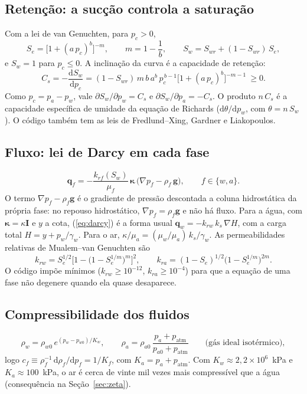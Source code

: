 \documentclass[11pt,a4paper]{article}
\newcommand{\vq}{\bm q}
\newcommand{\vg}{\bm g}
\newcommand{\tkap}{\bm\kappa}
\newcommand{\tI}{\bm I}
\newcommand{\patm}{p_{\mathrm{atm}}}
\newcommand{\dd}{\mathrm d}
\begin{document}
\subsection{Retenção: a sucção controla a saturação}
Com a lei de van Genuchten, para $p_c>0$,
\begin{equation}
S_e=\big[1+(a\,p_c)^{b}\big]^{-m},\qquad m=1-\frac1b,\qquad
S_w=S_{wr}+(1-S_{wr})\,S_e ,
\label{eq:vg}
\end{equation}
e $S_w=1$ para $p_c\le 0$. A inclinação da curva é a capacidade de retenção:
\begin{equation}
C_s=-\frac{\dd S_w}{\dd p_c}
=(1-S_{wr})\,m\,b\,a^{b}\,p_c^{\,b-1}\big[1+(a\,p_c)^{b}\big]^{-m-1}\ \ge 0 .
\label{eq:Cs}
\end{equation}
Como $p_c=p_a-p_w$, vale $\partial S_w/\partial p_w=C_s$ e $\partial S_w/\partial p_a=-C_s$.
O produto $n\,C_s$ é a capacidade específica de umidade da equação de Richards
($\dd\theta/\dd p_w$, com $\theta=n\,S_w$). O código também tem as leis de
Fredlund--Xing, Gardner e Liakopoulos.

\subsection{Fluxo: lei de Darcy em cada fase}
\begin{equation}
\vq_f=-\frac{k_{rf}(S_w)}{\mu_f}\,\tkap\,\big(\nabla p_f-\rho_f\,\vg\big),
\qquad f\in\{w,a\}.
\label{eq:darcy}
\end{equation}
O termo $\nabla p_f-\rho_f\vg$ é o gradiente de pressão descontada a coluna
hidrostática da própria fase: no repouso hidrostático, $\nabla p_f=\rho_f\vg$ e não
há fluxo. Para a água, com $\tkap=\kappa\tI$ e $y$ a cota, (\ref{eq:darcy}) é a forma
usual $\vq_w=-k_{rw}\,k_s\,\nabla H$, com a carga total $H=y+p_w/\gamma_w$. Para o
ar, $\kappa/\mu_a=(\mu_w/\mu_a)\,k_s/\gamma_w$. As permeabilidades relativas de
Mualem--van Genuchten são
\begin{equation}
k_{rw}=S_e^{1/2}\Big[1-\big(1-S_e^{1/m}\big)^{m}\Big]^{2},\qquad
k_{ra}=(1-S_e)^{1/2}\big(1-S_e^{1/m}\big)^{2m}.
\label{eq:mualem}
\end{equation}
O código impõe mínimos ($k_{rw}\ge10^{-12}$, $k_{ra}\ge10^{-4}$) para que a equação
de uma fase não degenere quando ela quase desaparece.

\subsection{Compressibilidade dos fluidos}
\begin{equation}
\rho_w=\rho_{w0}\,e^{(p_w-p_{w0})/K_w},\qquad
\rho_a=\rho_{a0}\,\frac{p_a+\patm}{p_{a0}+\patm}
\qquad\text{(gás ideal isotérmico)},
\label{eq:rho}
\end{equation}
logo $c_f\equiv\rho_f^{-1}\,\dd\rho_f/\dd p_f=1/K_f$, com $K_a=p_a+\patm$.
Com $K_w\approx2{,}2\times10^{6}$~kPa e $K_a\approx100$~kPa, o ar é cerca de vinte
mil vezes mais compressível que a água (consequência na Seção~\ref{sec:zeta}).
\end{document}
